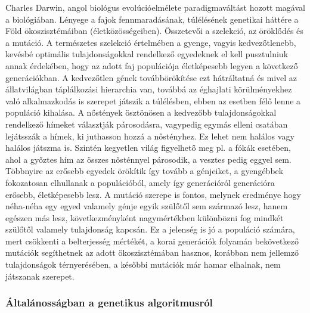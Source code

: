 \documentclass[12pt,a4paper]{report}
\begin{document}
Charles Darwin, angol biológus evolúcióelmélete paradigmaváltást hozott magával a biológiában. 
Lényege a fajok fennmaradásának, túlélésének genetikai háttére a Föld ökoszisztémáiban 
(életközösségeiben). Összetevői a szelekció, az öröklődés és a mutáció. A természetes 
szelekció értelmében a gyenge, vagyis kedvezőtlenebb, kevésbé optimális tulajdonságokkal 
rendelkező egyedeknek el kell pusztulniuk annak érdekében, hogy az adott faj populációja 
életképesebb legyen a következő generációkban. A kedvezőtlen gének továbbörökítése ezt
hátráltatná és mivel az állatvilágban táplálkozási hierarchia van, továbbá az éghajlati 
körülményekhez való alkalmazkodás is szerepet játszik a túlélésben, ebben az esetben félő 
lenne a populáció kihalása. A nőstények ösztönösen a kedvezőbb tulajdonságokkal rendelkező 
hímeket választják párosodásra, vagypedig egymás elleni csatában lejátsszák a hímek, ki 
juthasson hozzá a nőstényhez. Ez lehet nem halálos vagy halálos játszma is. Szintén kegyetlen 
világ figyelhető meg pl. a fókák esetében, ahol a győztes hím az összes nősténnyel párosodik, 
a vesztes pedig eggyel sem. Többnyire az erősebb egyedek örökítik így tovább a génjeiket, a
gyengébbek fokozatosan elhullanak a populációból, amely így generációról generációra erősebb,
életképesebb lesz. A mutáció szerepe is fontos, melynek eredménye hogy néha-néha egy egyed
valamely génje egyik szülőtől sem származó lesz, hanem egészen más lesz, következményként
nagymértékben különbözni fog mindkét szülőtől valamely tulajdonság kapcsán. Ez a jelenség is 
jó a populáció számára, mert csökkenti a belterjesség mértékét, a korai generációk folyamán
bekövetkező mutációk segíthetnek az adott ökoszisztémában hasznos, korábban nem jellemző
tulajdonságok térnyerésében, a későbbi mutációk már hamar elhalnak, nem játszanak szerepet.

\subsubsection{Általánosságban a genetikus algoritmusról}
\end{document}
